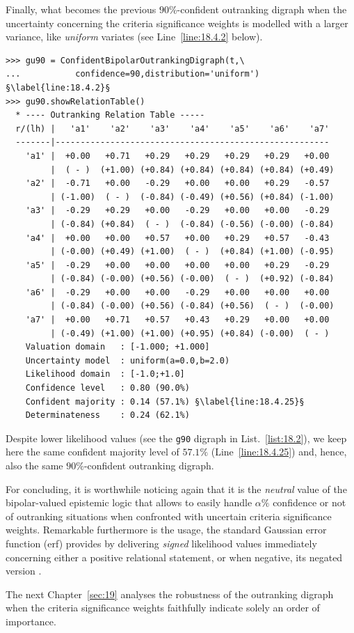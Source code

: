 Finally, what becomes the previous $90\%$-confident outranking digraph when the uncertainty concerning the criteria significance weights is modelled with a larger variance, like \emph{uniform} variates (see Line~\ref{line:18.4.2} below).
\begin{lstlisting}[caption={$90\%$-confident outranking digraph with uniform variates},label=list:18.4, basicstyle=\ttfamily\scriptsize]
>>> gu90 = ConfidentBipolarOutrankingDigraph(t,\
...           confidence=90,distribution='uniform') §\label{line:18.4.2}§
>>> gu90.showRelationTable()
  * ---- Outranking Relation Table -----
  r/(lh) |   'a1'    'a2'    'a3'    'a4'    'a5'    'a6'    'a7'	 
  -------|-------------------------------------------------------
    'a1' |  +0.00   +0.71   +0.29   +0.29   +0.29   +0.29   +0.00  
         |  ( - )  (+1.00) (+0.84) (+0.84) (+0.84) (+0.84) (+0.49) 
    'a2' |  -0.71   +0.00   -0.29   +0.00   +0.00   +0.29   -0.57  
         | (-1.00)  ( - )  (-0.84) (-0.49) (+0.56) (+0.84) (-1.00) 
    'a3' |  -0.29   +0.29   +0.00   -0.29   +0.00   +0.00   -0.29  
         | (-0.84) (+0.84)  ( - )  (-0.84) (-0.56) (-0.00) (-0.84) 
    'a4' |  +0.00   +0.00   +0.57   +0.00   +0.29   +0.57   -0.43  
         | (-0.00) (+0.49) (+1.00)  ( - )  (+0.84) (+1.00) (-0.95) 
    'a5' |  -0.29   +0.00   +0.00   +0.00   +0.00   +0.29   -0.29  
         | (-0.84) (-0.00) (+0.56) (-0.00)  ( - )  (+0.92) (-0.84) 
    'a6' |  -0.29   +0.00   +0.00   -0.29   +0.00   +0.00   +0.00  
         | (-0.84) (-0.00) (+0.56) (-0.84) (+0.56)  ( - )  (-0.00) 
    'a7' |  +0.00   +0.71   +0.57   +0.43   +0.29   +0.00   +0.00  
         | (-0.49) (+1.00) (+1.00) (+0.95) (+0.84) (-0.00)  ( - )  
    Valuation domain   : [-1.000; +1.000] 
    Uncertainty model  : uniform(a=0.0,b=2.0) 
    Likelihood domain  : [-1.0;+1.0] 
    Confidence level   : 0.80 (90.0%) 
    Confident majority : 0.14 (57.1%) §\label{line:18.4.25}§
    Determinateness    : 0.24 (62.1%)
\end{lstlisting}

Despite lower likelihood values (see the \texttt{g90} digraph in List.~\vref{list:18.2}), we keep here the same confident majority level of $57.1\%$ (Line~\ref{line:18.4.25}) and, hence, also the same $90\%$-confident outranking digraph.

For concluding, it is worthwhile noticing again that it is the \emph{neutral} value of the bipolar-valued epistemic logic that allows to easily handle $\alpha\%$ confidence or not of outranking situations when confronted with uncertain criteria significance weights. Remarkable furthermore is the usage, the standard Gaussian error function (erf) provides by delivering \emph{signed} likelihood values immediately concerning either a positive relational statement, or when negative, its negated version \citep{NR3-2007-6}. 

\vspace{\baselineskip}
The next Chapter~\ref{sec:19} analyses the robustness of the outranking digraph when the criteria significance weights faithfully indicate solely an order of importance.
{}
{}

%
%

